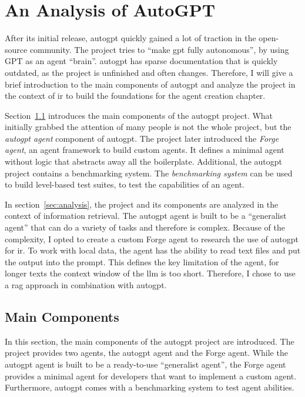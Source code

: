 \documentclass[../main.tex]{subfiles}
\begin{document}
\chapter{An Analysis of AutoGPT}
\label{ch:autogpt}

After its initial release,
\gls{autogpt} quickly gained a lot of traction in the open-source community.
The project tries to ``make \gls{gpt} fully autonomous'',
by using GPT as an agent ``brain''.
\gls{autogpt} has sparse documentation that is quickly outdated,
as the project is unfinished and often changes.
Therefore, I will give a brief introduction to the main components of
\gls{autogpt} and analyze the project in the context of \gls{ir} to build
the foundations for the agent creation chapter.

Section~\ref{sec:components} introduces the main components of the \gls{autogpt} project.
What initially grabbed the attention of many people is not the whole project,
but the \emph{\gls{autogpt} agent} component of \gls{autogpt}.
The project later introduced the \emph{Forge agent},
an agent framework to build custom agents.
It defines a minimal agent without logic
that abstracts away all the boilerplate.
Additional, the \gls{autogpt} project contains a benchmarking system.
The \emph{benchmarking system} can be used to build level-based test suites,
to test the capabilities of an agent.

In section~\ref{sec:analysis}, the project and its components
are analyzed in the context of information retrieval.
The \gls{autogpt} agent is built to be a ``generalist agent'' that can do
a variety of tasks and therefore is complex.
Because of the complexity,
I opted to create a custom Forge agent to research the use of \gls{autogpt} for \gls{ir}.
To work with local data, the agent has the ability to read text files
and put the output into the prompt.
This defines the key limitation of the agent, for longer texts the context
window of the \gls{llm} is too short.
Therefore, I chose to use a \gls{rag} approach in combination with \gls{autogpt}.

\section{Main Components}
\label{sec:components}

In this section, the main components of the \gls{autogpt} project are introduced.
The project provides two agents, the \gls{autogpt} agent and the Forge agent.
While the \gls{autogpt} agent is built to be a ready-to-use ``generalist agent'',
the Forge agent provides a minimal agent for developers that want to implement
a custom agent.
Furthermore, \gls{autogpt} comes with a benchmarking system to test agent abilities.
\end{document}
